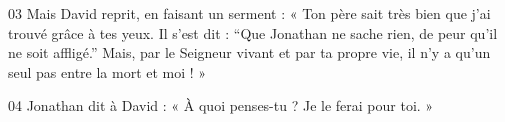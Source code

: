 
03 Mais David reprit, en faisant un serment : « Ton père sait très bien que j’ai trouvé grâce à tes yeux. Il s’est dit : “Que Jonathan ne sache rien, de peur qu’il ne soit affligé.” Mais, par le Seigneur vivant et par ta propre vie, il n’y a qu’un seul pas entre la mort et moi ! »

04 Jonathan dit à David : « À quoi penses-tu ? Je le ferai pour toi. »
